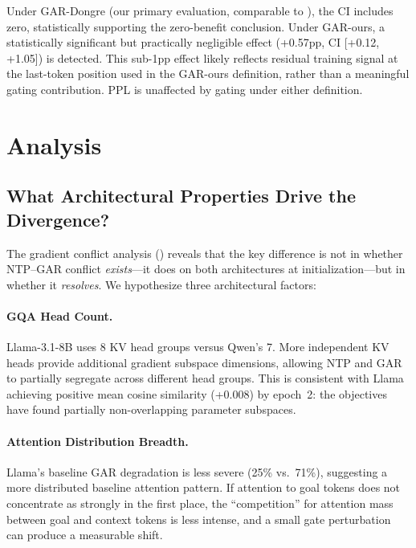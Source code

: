\documentclass[11pt,a4paper]{article}
\begin{document}
Under GAR-Dongre (our primary evaluation, comparable to \citeauthor{dongre2026multiturn}), the CI includes zero, statistically supporting the zero-benefit conclusion.
Under GAR-ours, a statistically significant but practically negligible effect (+0.57pp, CI [+0.12, +1.05]) is detected.
This sub-1pp effect likely reflects residual training signal at the last-token position used in the GAR-ours definition, rather than a meaningful gating contribution.
PPL is unaffected by gating under either definition.

\section{Analysis}
\label{sec:analysis}

\subsection{What Architectural Properties Drive the Divergence?}

The gradient conflict analysis () reveals that the key difference is not in whether NTP--GAR conflict \emph{exists}---it does on both architectures at initialization---but in whether it \emph{resolves}.
We hypothesize three architectural factors:

\paragraph{GQA Head Count.}
Llama-3.1-8B uses 8 KV head groups versus Qwen's 7.
More independent KV heads provide additional gradient subspace dimensions, allowing NTP and GAR to partially segregate across different head groups.
This is consistent with Llama achieving positive mean cosine similarity (+0.008) by epoch~2: the objectives have found partially non-overlapping parameter subspaces.

\paragraph{Attention Distribution Breadth.}
Llama's baseline GAR degradation is less severe (25\% vs.\ 71\%), suggesting a more distributed baseline attention pattern.
If attention to goal tokens does not concentrate as strongly in the first place, the ``competition'' for attention mass between goal and context tokens is less intense, and a small gate perturbation can produce a measurable shift.
\end{document}
